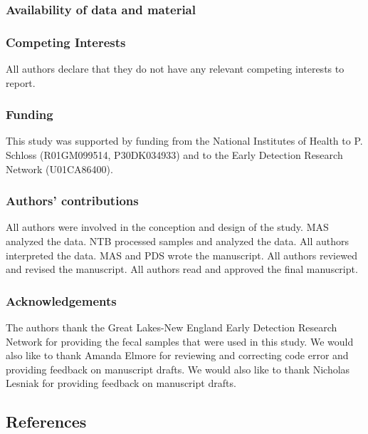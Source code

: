 \documentclass[12pt,]{article}
\begin{document}
\subsubsection{Availability of data and
material}\label{availability-of-data-and-material}

\subsubsection{Competing Interests}\label{competing-interests}

All authors declare that they do not have any relevant competing
interests to report.

\subsubsection{Funding}\label{funding}

This study was supported by funding from the National Institutes of
Health to P. Schloss (R01GM099514, P30DK034933) and to the Early
Detection Research Network (U01CA86400).

\subsubsection{Authors' contributions}\label{authors-contributions}

All authors were involved in the conception and design of the study. MAS
analyzed the data. NTB processed samples and analyzed the data. All
authors interpreted the data. MAS and PDS wrote the manuscript. All
authors reviewed and revised the manuscript. All authors read and
approved the final manuscript.

\subsubsection{Acknowledgements}\label{acknowledgements}

The authors thank the Great Lakes-New England Early Detection Research
Network for providing the fecal samples that were used in this study. We
would also like to thank Amanda Elmore for reviewing and correcting code
error and providing feedback on manuscript drafts. We would also like to
thank Nicholas Lesniak for providing feedback on manuscript drafts.

\newpage

\subsection*{References}\label{references}
\end{document}
